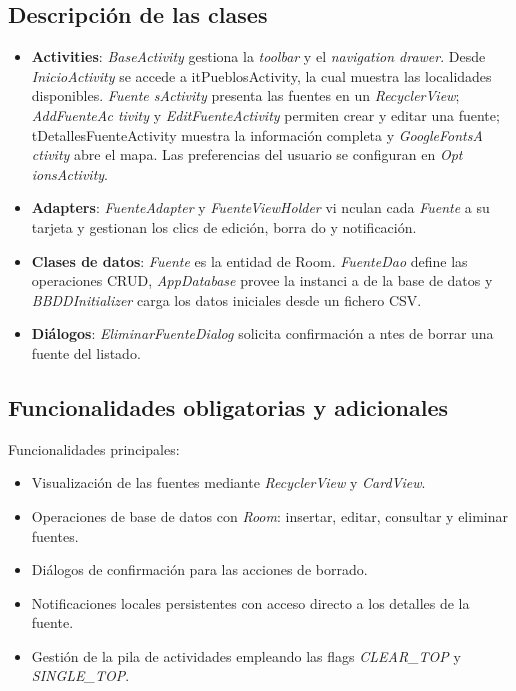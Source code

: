 \documentclass[11pt,a4paper]{article}
\begin{document}
\subsection{Descripción de las clases}

\begin{itemize}
    \item \textbf{Activities}: \textit{BaseActivity} gestiona la \textit{toolbar}
    y el \textit{navigation drawer}. Desde \textit{InicioActivity} se accede a \text
    it{PueblosActivity}, la cual muestra las localidades disponibles. \textit{Fuente
    sActivity} presenta las fuentes en un \textit{RecyclerView}; \textit{AddFuenteAc
    tivity} y \textit{EditFuenteActivity} permiten crear y editar una fuente; \texti
    t{DetallesFuenteActivity} muestra la información completa y \textit{GoogleFontsA
    ctivity} abre el mapa. Las preferencias del usuario se configuran en \textit{Opt
    ionsActivity}.
    \item \textbf{Adapters}: \textit{FuenteAdapter} y \textit{FuenteViewHolder} vi
    nculan cada \textit{Fuente} a su tarjeta y gestionan los clics de edición, borra
    do y notificación.
    \item \textbf{Clases de datos}: \textit{Fuente} es la entidad de Room. \textit
    {FuenteDao} define las operaciones CRUD, \textit{AppDatabase} provee la instanci
    a de la base de datos y \textit{BBDDInitializer} carga los datos iniciales desde
     un fichero CSV.
    \item \textbf{Diálogos}: \textit{EliminarFuenteDialog} solicita confirmación a
    ntes de borrar una fuente del listado.
\end{itemize}



\subsection{Funcionalidades obligatorias y adicionales}

Funcionalidades principales:
\begin{itemize}
  \item Visualización de las fuentes mediante \textit{RecyclerView} y \textit{CardView}.
  \item Operaciones de base de datos con \textit{Room}: insertar, editar, consultar y eliminar fuentes.
  \item Diálogos de confirmación para las acciones de borrado.
  \item Notificaciones locales persistentes con acceso directo a los detalles de la fuente.
  \item Gestión de la pila de actividades empleando las flags \textit{CLEAR\_TOP} y \textit{SINGLE\_TOP}.
\end{itemize}
\end{document}
